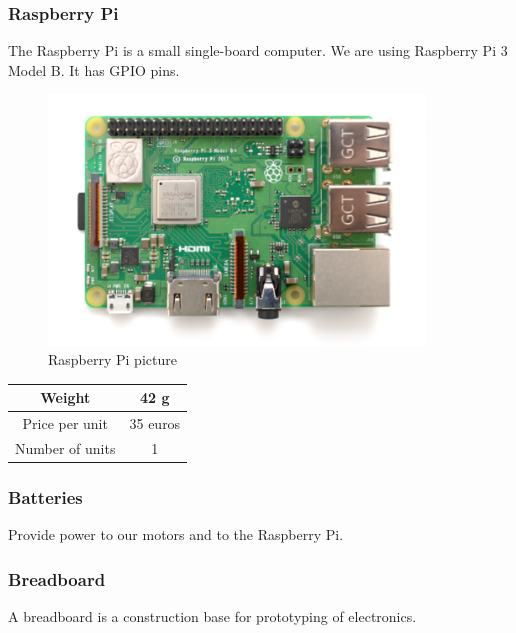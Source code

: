 \subsubsection{Raspberry Pi}
The Raspberry Pi is a small single-board computer. We are using Raspberry Pi 3 Model B. It has GPIO pins.
\begin{figure}[H]
    \centering
    \includegraphics[width=10cm]{img/components/raspberry_pi.png}
    \caption{Raspberry Pi picture}
    \label{fig:}
\end{figure}
\begin{center}
    \begin{tabular}{ |c|c| }
        \hline
        Weight          & 42 g      \\
        \hline
        Price per unit  & 35 euros \\
        \hline
        Number of units & 1        \\
        \hline
    \end{tabular}
\end{center}
\subsubsection{Batteries}
Provide power to our motors and to the Raspberry Pi.
\subsubsection{Breadboard}
A breadboard is a construction base for prototyping of electronics.

